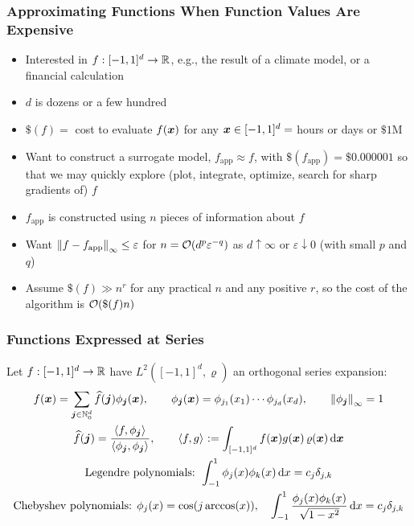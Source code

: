 \documentclass[11pt,compress,xcolor={usenames,dvipsnames},aspectratio=169]{beamer}
\newcommand{\fappx}{f_{\text{app}}}
\begin{document}
\begin{frame}
\frametitle{Approximating Functions When Function Values Are Expensive}

\vspace{-5ex}

\begin{itemize}
	\item Interested in $f:[-1,1]^d \to \reals$, e.g., the result of a climate model, or a financial calculation
	
	\item  $d$ is dozens or a few hundred
	
	\item  \alert{$\$(f) = $}  cost to evaluate $f(\vx)$ for any $\vx \in [-1,1]^d =$ hours or days or \alert{$\$1$M}
	
	\item Want to construct a surrogate model, $\fappx \approx f$, with \alert{$\$(\fappx) =  \$0.000001$} so that we may quickly explore (plot, integrate, optimize, search for sharp gradients of) $f$
	
	\item $\fappx$ is constructed using $n$ pieces of information about $f$
	
	\item Want $\norm[\infty]{f - \fappx} \le \varepsilon$ for  \alert{$n = \Order(d^p \varepsilon^{-q})$} as $d \uparrow \infty$ or $\varepsilon \downarrow 0$ (with small $p$ and $q$)

	\item Assume \alert{$\$(f) \gg n^r$} for any practical $n$ and any positive $r$, so the \alert{cost} of the algorithm is \alert{$\Order(\$(f)n)$}
	
	
\end{itemize}

\end{frame}

\begin{frame}
\frametitle{Functions Expressed at Series}
\vspace{-4ex}
Let $f:[-1,1]^d \to \reals$  have  $L^2([-1,1]^d,\varrho)$ an orthogonal series expansion:
\begin{gather*}
f(\vx) = \sum_{\vj \in \natzero^d} \hf(\vj) \phi_{\vj}(\vx), \qquad \phi_{\vj}(\vx) = \phi_{j_1}(x_1) \cdots  \phi_{j_d}(x_d), \qquad \norm[\infty]{\phi_{\vj}} = 1 \\
\hf(\vj) = \frac{\ip{f}{\phi_{\vj}}}{\ip{\phi_{\vj}}{\phi_{\vj}}}, \qquad 
\ip{f}{g} := \int_{[-1,1]^d} f(\vx)g(\vx) \, \varrho(\vx) \, \dif \vx \\
\text{Legendre polynomials: } \int_{-1}^1 \phi_j(x) \phi_k(x) \, \dif x = c_j\delta_{j,k} \\
\text{Chebyshev polynomials: } \phi_j(x) = \cos(j\arccos(x)), \quad \int_{-1}^1  \frac{\phi_j(x) \phi_k(x)}{\sqrt{1 - x^2}} \, \dif x = c_j\delta_{j,k} 
\end{gather*}
\end{frame}
\end{document}
